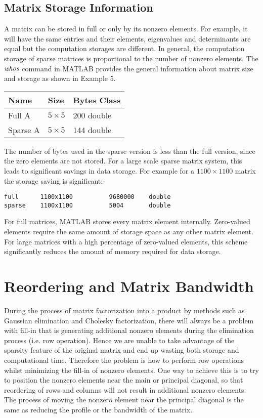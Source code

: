 \subsection{Matrix Storage Information}
A matrix can be stored in full or only by its nonzero elements. For example, it
will have the same entries and their elements, eigenvalues and determinants are
equal but the computation storages are different.  In general, the computation
storage of sparse matrices is proportional to the number of nonzero elements.
The $\emph{whos}$ command in MATLAB provides the general information about
matrix size and storage as shown in Example 5.
\vskip 10pt
\noindent
\begin{center}
    \begin{tabular}{ l l l }
        \hline
        Name      & Size     & Bytes Class  \\
        \hline
        Full A    &$5\times5$& 200 double\\
        Sparse A  &$5\times5$& 144 double\\
    \end{tabular}
\end{center}
\vskip 10pt
\noindent
The number of bytes used in the sparse version is less than the full version,
since the zero elements are not stored.  For a large scale sparse matrix system,
this leads to significant savings in data storage.  For example for a
$1100\times 1100$ matrix the storage saving is significant:-
\vskip 1pt
\noindent
\ttfamily
\begin{lstlisting}
full      1100x1100          9680000	double
sparse    1100x1100          5004	    double
\end{lstlisting}
\rmfamily
\noindent
For full matrices, MATLAB stores every matrix element internally.   Zero-valued
elements require the same amount of storage space as any other matrix element.
For large matrices with a high percentage of zero-valued elements, this scheme
significantly reduces the amount of memory required for data storage.

\newpage
\section{Reordering and Matrix Bandwidth}
During the process of matrix factorization into a product by methods such as
Gaussian elimination and Cholesky factorization, there will always be a problem
with fill-in that is generating additional nonzero elements during the
elimination process (i.e. row operation).   Hence we are unable to take
advantage of the sparsity feature of the original matrix and end up wasting both
storage and computational time.  Therefore the problem is how to perform row
operations whilst minimizing the fill-in of nonzero elements.  One way to
achieve this is to try to position the nonzero elements near the main or
principal diagonal, so that reordering of rows and columns will not result in
additional nonzero elements.  The process of moving the nonzero element near the
principal diagonal is the same as reducing the profile or the bandwidth of the
matrix.

